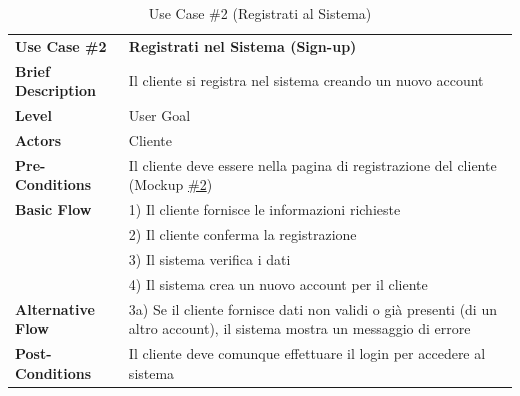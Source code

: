 \documentclass{article}
\begin{document}
    
    \begin{table}[p]
        \begin{tabularx}{\textwidth}{ | l  X | }
            \hline
            \rowcolor{lightgray!70}
            \textbf{Use Case \#2} & \textbf{Registrati nel Sistema (Sign-up)}\\ [0.5ex]
            \textbf{Brief Description} & Il cliente si registra nel sistema creando un nuovo account \\
            \rowcolor{blue!10}
            \textbf{Level} & User Goal \\
            \textbf{Actors} & Cliente \\
            \rowcolor{blue!10}
            \textbf{Pre-Conditions} & Il cliente deve essere nella pagina di registrazione del cliente (Mockup \hyperref[fig:mockup_2]{\#2})\\
            \textbf{Basic Flow} & 1) Il cliente fornisce le informazioni richieste\\
            & 2) Il cliente conferma la registrazione\\
            & 3) Il sistema verifica i dati\\
            & 4) Il sistema crea un nuovo account per il cliente\\  
            \rowcolor{blue!10}
            \textbf{Alternative Flow} & 3a) Se il cliente fornisce dati non validi o già presenti (di un altro account), il sistema mostra un messaggio di errore\\
            \textbf{Post-Conditions} & Il cliente deve comunque effettuare il login per accedere al sistema\\
            \hline
        \end{tabularx}
        \label{use_case_2}
        \caption{Use Case \#2 (Registrati  al Sistema)}
    \end{table}
    
\end{document}
